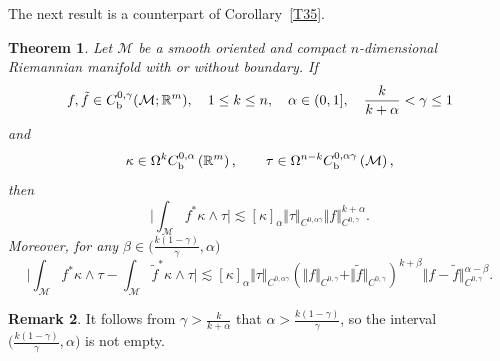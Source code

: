 \documentclass[intlimits,12pt,reqno]{amsart}
\newcommand{\cM}{\mathcal M}
\newcommand{\R}{\mathbb R}
\numberwithin{equation}{section}
\newtheorem{theorem}{Theorem}[section]
\theoremstyle{definition}
\newtheorem{remark}[theorem]{Remark}
\begin{document}
The next result is a counterpart of Corollary~\ref{T35}.
\begin{theorem}
\label{T96}
Let $\cM$ be a smooth oriented and compact $n$-dimensional Riemannian manifold with or without boundary. If
$$
f,\tilde{f}\in C_{\rm b}^{0,\gamma}(\cM;\R^m),
\quad 
1\leq k\leq n, 
\quad
\alpha\in (0,1],
\quad 
\frac{k}{k+\alpha}<\gamma\leq 1
$$
and 
$$
\kappa\in \Omega^kC_{\rm b}^{0,\alpha}\left(\R^m\right),
\qquad
\tau\in \Omega^{n-k}C_{\rm b}^{0,\alpha\gamma}\left(\cM\right),
$$
then 
\begin{equation}
\label{eq98}
\Bigg| \int_{\cM} f^*\kappa\wedge\tau\Bigg|\lesssim[\kappa]_{\alpha}
\Vert\tau\Vert_{C^{0,\alpha\gamma}}
\Vert f\Vert_{C^{0,\gamma}}^{k+\alpha}.
\end{equation}
Moreover,
for any $\beta\in \big(\frac{k(1-\gamma)}{\gamma},\alpha\big)$
\begin{equation}
\label{eq99}
\Bigg| \int_{\cM} f^*\kappa\wedge\tau - \int_{\cM} \tilde{f}^*\kappa\wedge\tau\Bigg|\lesssim
[\kappa]_{\alpha}\Vert\tau\Vert_{C^{0,\alpha\gamma}}
(\Vert f\Vert_{C^{0,\gamma}}+\Vert\tilde{f}\Vert_{C^{0,\gamma}})^{k+\beta}
\Vert f-\tilde{f}\Vert_{C^{0,\gamma}}^{\alpha-\beta}.
\end{equation}
\end{theorem}
\begin{remark}
It follows from $\gamma>\frac{k}{k+\alpha}$ that $\alpha>\frac{k(1-\gamma)}{\gamma}$, so the interval $\big(\frac{k(1-\gamma)}{\gamma},\alpha\big)$ is not empty.
\end{remark}
\end{document}

